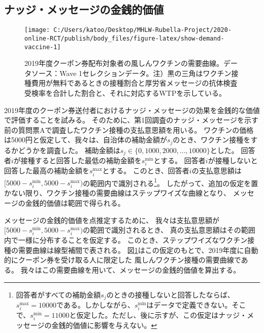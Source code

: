 \documentclass[
  11pt,
  a4paper,
]{article}
\begin{document}
\hypertarget{econvalue}{%
\subsection{ナッジ・メッセージの金銭的価値}\label{econvalue}}

\begin{figure}[t]
\texttt{[image: C:/Users/katoo/Desktop/MHLW-Rubella-Project/2020-online-RCT/publish/body\_files/figure-latex/show-demand-vaccine-1]} \caption{2019年度クーポン券配布対象者の風しんワクチンの需要曲線。データソース：Wave 1セレクションデータ。注）黒の三角はワクチン接種費用が無料であるときの接種割合と厚労省メッセージの抗体検査受検率を合計した割合と、それに対応するWTPを示している。}\label{fig:show-demand-vaccine}
\end{figure}

2019年度のクーポン券送付者におけるナッジ・メッセージの効果を金銭的な価値で評価することを試みる。
そのために、第1回調査のナッジ・メッセージを示す前の質問票Aで調査したワクチン接種の支払意思額を用いる。
ワクチンの価格は5000円と仮定して、我々は、自治体の補助金額が\(s_j\)のとき、ワクチン接種をするかどうかを調査した。
補助金額は\(s_j \in \{0, 1000, 2000, \ldots, 10000\}\)とした。
回答者\(i\)が接種すると回答した最低の補助金額を\(s_i^{\text{min}}\)とする。
回答者\(i\)が接種しないと回答した最高の補助金額を\(s_i^{\text{max}}\)とする。
このとき、回答者\(i\)の支払意思額は
\([5000 - s_i^{\text{min}}, 5000 - s_i^{\text{max}})\)の範囲内で識別される\footnote{回答者がすべての補助金額\(s_j\)のときの接種しないと回答したならば、\(s_i^{\text{max}} = 10000\)である。しかしながら、\(s_i^{\text{min}}\)はデータで定義できない。そこで、\(s_i^{\text{min}} = 11000\)と仮定した。ただし、後に示すが、この仮定はナッジ・メッセージの金銭的価値に影響を与えない。}。
したがって、追加の仮定を置かない限り、ワクチン接種の需要曲線はステップワイズな曲線となり、
メッセージの金銭的価値は範囲で得られる。

メッセージの金銭的価値を点推定するために、
我々は支払意思額が\([5000 - s_i^{\text{min}}, 5000 - s_i^{\text{max}})\)の範囲で識別されるとき、
真の支払意思額はその範囲内で一様に分布することを仮定する。
このとき、ステップワイズなワクチン接種の需要曲線は線型補間で表される。
図\ref{fig:show-demand-vaccine}はこの仮定のもとで、2019年度に自動的にクーポン券を受け取る人に限定した
風しんワクチン接種の需要曲線である。
我々はこの需要曲線を用いて、メッセージの金銭的価値を算出する。
\end{document}
